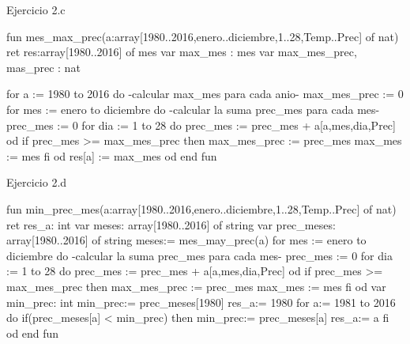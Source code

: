 \begin{codebox}{Ejercicio 2.c}
\begin{pascallike}
fun mes_max_prec(a:array[1980..2016,enero..diciembre,1..28,Temp..Prec] of nat)
ret res:array[1980..2016] of mes
    var max_mes : mes
    var max_mes_prec, mas_prec : nat

    for a := 1980 to 2016 do
        {-calcular max_mes para cada anio-}
        max_mes_prec := 0
        for mes := enero to diciembre do
            {-calcular la suma prec_mes para cada mes-}
            prec_mes := 0
            for dia := 1 to 28 do
                prec_mes := prec_mes + a[a,mes,dia,Prec]
            od
            if prec_mes >= max_mes_prec then
                max_mes_prec := prec_mes
                max_mes := mes
            fi
        od
        res[a] := max_mes
    od
end fun
\end{pascallike}
\end{codebox}

\begin{codebox}{Ejercicio 2.d}
\begin{pascallike}
fun min_prec_mes(a:array[1980..2016,enero..diciembre,1..28,Temp..Prec] of nat)
ret res_a: int
    var meses: array[1980..2016] of string
    var prec_meses: array[1980..2016] of string
    meses:= mes_may_prec(a)
    for mes := enero to diciembre do
            {-calcular la suma prec_mes para cada mes-}
            prec_mes := 0
            for dia := 1 to 28 do
                prec_mes := prec_mes + a[a,mes,dia,Prec]
            od
            if prec_mes >= max_mes_prec then
                max_mes_prec := prec_mes
                max_mes := mes
            fi
        od
    var min_prec: int
    min_prec:= prec_meses[1980]
    res_a:= 1980
    for a:= 1981 to 2016 do
        if(prec_meses[a] < min_prec) then
            min_prec:= prec_meses[a]
            res_a:= a
        fi
    od
end fun
\end{pascallike}
\end{codebox}

